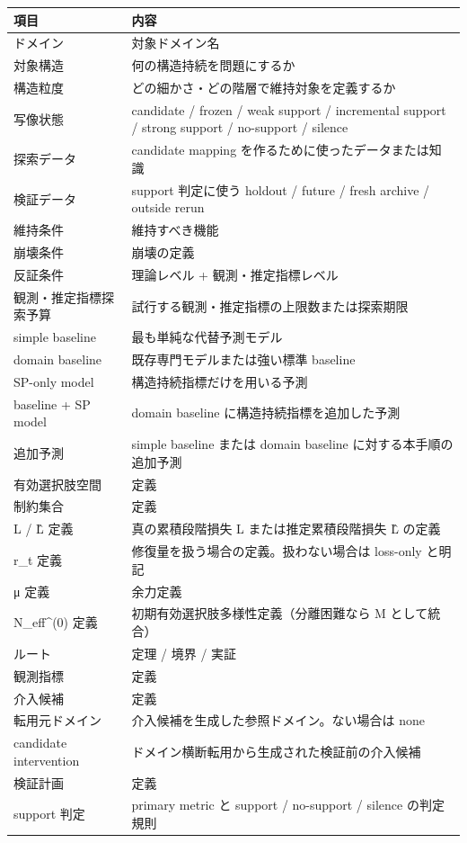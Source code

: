 \documentclass[12pt,a4paper]{article}
\begin{document}
{\def\LTcaptype{table} %
\begin{longtable}[]{@{}
  >{\raggedright\arraybackslash}p{}
  >{\raggedright\arraybackslash}p{}@{}}
\toprule\noalign{}
\begin{minipage}[b]{\linewidth}\raggedright
項目
\end{minipage} & \begin{minipage}[b]{\linewidth}\raggedright
内容
\end{minipage} \\
\midrule\noalign{}
\endhead
\bottomrule\noalign{}
\endlastfoot
ドメイン & 対象ドメイン名 \\
対象構造 & 何の構造持続を問題にするか \\
構造粒度 & どの細かさ・どの階層で維持対象を定義するか \\
写像状態 & candidate / frozen / weak support / incremental support / strong support / no-support / silence \\
探索データ & candidate mapping を作るために使ったデータまたは知識 \\
検証データ & support 判定に使う holdout / future / fresh archive / outside rerun \\
維持条件 & 維持すべき機能 \\
崩壊条件 & 崩壊の定義 \\
反証条件 & 理論レベル + 観測・推定指標レベル \\
観測・推定指標探索予算 & 試行する観測・推定指標の上限数または探索期限 \\
simple baseline & 最も単純な代替予測モデル \\
domain baseline & 既存専門モデルまたは強い標準 baseline \\
SP-only model & 構造持続指標だけを用いる予測 \\
baseline + SP model & domain baseline に構造持続指標を追加した予測 \\
追加予測 & simple baseline または domain baseline に対する本手順の追加予測 \\
有効選択肢空間 & 定義 \\
制約集合 & 定義 \\
L / L̂ 定義 & 真の累積段階損失 L または推定累積段階損失 L̂ の定義 \\
r\_t 定義 & 修復量を扱う場合の定義。扱わない場合は loss-only と明記 \\
μ 定義 & 余力定義 \\
N\_eff\^{}(0) 定義 & 初期有効選択肢多様性定義（分離困難なら M として統合） \\
ルート & 定理 / 境界 / 実証 \\
観測指標 & 定義 \\
介入候補 & 定義 \\
転用元ドメイン & 介入候補を生成した参照ドメイン。ない場合は none \\
candidate intervention & ドメイン横断転用から生成された検証前の介入候補 \\
検証計画 & 定義 \\
support 判定 & primary metric と support / no-support / silence の判定規則 \\
\end{longtable}
}
\end{document}
